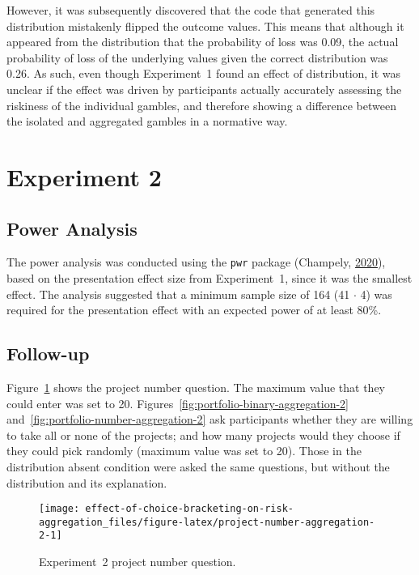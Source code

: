 \documentclass[
  english,
  man, donotrepeattitle,floatsintext]{apa7}
\theoremstyle{definition}
\theoremstyle{definition}
\theoremstyle{definition}
\theoremstyle{definition}
\theoremstyle{remark}
\begin{document}
However, it was subsequently discovered that the code that generated this
distribution mistakenly flipped the outcome values. This means that although it
appeared from the distribution that the probability of loss was
0.09, the actual probability of loss of the
underlying values given the correct distribution was
0.26. As such, even though Experiment~1
found an effect of distribution, it was unclear if the effect was driven by
participants actually accurately assessing the riskiness of the individual
gambles, and therefore showing a difference between the isolated and aggregated
gambles in a normative way.

\hypertarget{experiment-2}{%
\section{Experiment 2}\label{experiment-2}}

\hypertarget{power-analysis-aggregation-2}{%
\subsection{Power Analysis}\label{power-analysis-aggregation-2}}

The power analysis was conducted using the \texttt{pwr} package (Champely, \protect\hyperlink{ref-champely2020}{2020}), based
on the presentation effect size from Experiment~1, since it was the smallest
effect. The analysis suggested that a minimum sample size of
164 (41 \(\cdot\) 4) was required for
the presentation effect with an expected power of at least 80\%.

\hypertarget{follow-up-materials-aggregation-2-appendix}{%
\subsection{Follow-up}\label{follow-up-materials-aggregation-2-appendix}}

Figure~\ref{fig:project-number-aggregation-2} shows the project number
question. The maximum value that they could enter was set to 20.
Figures~\ref{fig:portfolio-binary-aggregation-2}
and~\ref{fig:portfolio-number-aggregation-2} ask participants whether they are
willing to take all or none of the projects; and how many projects would they
choose if they could pick randomly (maximum value was set to 20). Those in the
distribution absent condition were asked the same questions, but without the
distribution and its explanation.



\begin{figure}
\texttt{[image: effect-of-choice-bracketing-on-risk-aggregation\_files/figure-latex/project-number-aggregation-2-1]} \caption{Experiment~2 project number question.}\label{fig:project-number-aggregation-2}
\end{figure}
\end{document}
